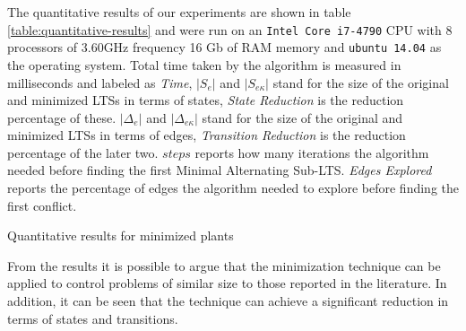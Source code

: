 

  
  
The quantitative results of our experiments are shown in table 
\ref{table:quantitative-results} and were run on an 
\texttt{Intel\textsuperscript{\textregistered} Core\textsuperscript{\texttrademark}
 i7-4790} CPU with 8 processors of 3.60GHz frequency
16 Gb of RAM memory and \texttt{ubuntu 14.04} as the operating system.
Total time taken by the algorithm is measured in milliseconds and
labeled as \emph{Time}, $|S_e|$ and $|S_{e\kappa}|$ stand for
the size of the original and minimized LTSs in terms of states,
\emph{State Reduction} is the reduction percentage of these.  
$|\Delta_e|$ and $|\Delta_{e\kappa}|$ stand for
the size of the original and minimized LTSs in terms of edges,
\emph{Transition Reduction} is the reduction percentage of the later two.  
$steps$ reports how many iterations the algorithm needed before finding
the first Minimal Alternating Sub-LTS. \emph{Edges Explored} reports the percentage of
edges the algorithm needed to explore before finding the first
conflict.
\begin{table*}
	\resizebox{\textwidth}{!} {

}
  \caption{Quantitative results for minimized plants}
  \label{table:quantitative-results}
 \end{table*}



From the results it is possible to argue that the minimization technique can be applied to control problems of similar size to those reported in the literature. 
In addition, it can be seen that the technique can achieve a significant reduction in terms of states and transitions.



